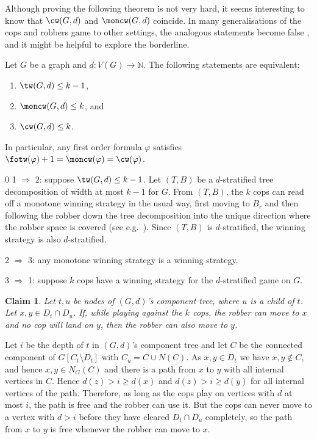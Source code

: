 \documentclass{LMCS}
\newtheorem{clam}{Claim}
\renewcommand{\phi}{\varphi}
\begin{document}
Although proving the following theorem is not very hard, it seems interesting
to know that $\cw(G,d)$ and $\moncw(G,d)$ coincide. In many generalisations
of the cops and robbers game to other settings, the analogous statements  
become false \cite{adl04,Adler07,kreord08}, and it might be helpful to 
explore the borderline.

\begin{thm}\label{theo:games}
	Let $G$ be a graph and $d:V(G)\to\mathbb N$.
	The following statements
	are equivalent:
	\begin{enumerate}[\em(1)]
		\item $\tw(G,d)\leq k-1$, 
		\item $\moncw(G,d)\leq k$, and
		\item $\cw(G,d)\leq k$.
	\end {enumerate}
In particular, any first order formula $\phi$ satisfies
	$\fotw(\phi)+1=\moncw(\phi)=\cw(\phi)$.
\end{thm}

\proof
\setcounter{clam}0
1 $\Rightarrow$ 2: suppose $\tw(G,d)\leq k-1$. Let $(T,B)$ be a 
	$d$-stratified tree decomposition of width at most $k-1$ for $G$.
{}From $(T,B)$, the $k$ cops can read off a monotone winning strategy 
in the usual way, first moving to $B_r$ 
and then following the robber down the tree decomposition into the unique
	direction where the robber space is covered (see e.g.~\cite{Adler08a}).	
Since $(T,B)$ is $d$-stratified, the winning strategy is also $d$-stratified.
	
	2 $\Rightarrow$ 3: any monotone winning strategy is a winning strategy.

	3 $\Rightarrow$ 1: suppose $k$ cops have a winning strategy 
for the $d$-stratified game on $G$.

\begin{clam}
Let $t,u$ be nodes of $(G,d)$'s component tree, where $u$ is a child of $t$.
Let $x,y\in D_t\cap D_u$.
If, while playing against the $k$ cops, 
the robber can move to $x$ and no cop will land on $y$, then
the robber can also move to $y$.
\end{clam}

Let $i$ be the depth of
$t$ in $(G,d)$'s component tree and let $C$ be the connected component of
$G[C_t\setminus D_t]$ with $C_u=C\cup N(C)$. 
As $x,y\in D_t$ we have $x,y\not\in C$, and hence $x,y\in N_{G}(C)$ 
and there is a path from $x$ to $y$ with all internal vertices
		in $C$. Hence $d(z)>i\geq d(x)$ and $d(z)>i\geq d(y)$ for all internal vertices
		of the path. Therefore, as long as the cops play on vertices with $d$ at most $i$, 
		the path is free and the robber can use it. But the cops
      can never move to a vertex with $d>i$ before they have cleared $D_t\cap D_u$ completely,
		so the path from $x$ to $y$ is free whenever the robber can move to $x$. 
\cqed
\end{document}
